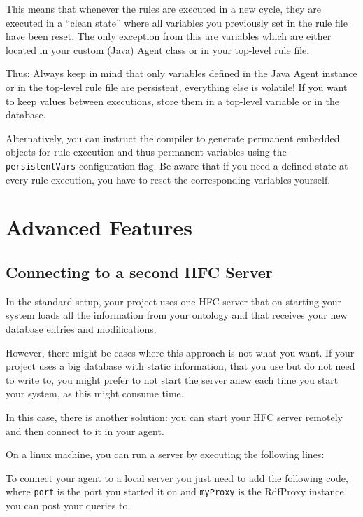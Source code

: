 This means that whenever the \vonda rules are executed in a new cycle,
they are executed in a ``clean state'' where all variables you
previously set in the rule file have been reset. The only exception
from this are variables which are either located in your custom (Java)
Agent class or in your top-level rule file.

Thus: Always keep in mind that only variables defined in the Java
Agent instance or in the top-level rule file are persistent,
everything else is volatile! If you want to keep values between
executions, store them in a top-level variable or in the database.

Alternatively, you can instruct the compiler to generate permanent embedded
objects for rule execution and thus permanent variables using the
\texttt{persistentVars} configuration flag. Be aware that if you need a defined
state at every rule execution, you have to reset the corresponding variables
yourself.

\section{Advanced Features}

\subsection{Connecting to a second HFC Server} \label{sec:2ndHfc}
In the standard setup, your \vonda project uses one HFC server that on starting your system loads all the information from your ontology and that receives your new database entries and modifications.

However, there might be cases where this approach is not what you want. If your project uses a big database with static information, that you use but do not need to write to, you might prefer to not start the server anew each time you start your system, as this might consume time.

In this case, there is another solution: you can start your HFC server remotely and then connect to it in your \vonda agent.

On a linux machine, you can run a server by executing the following lines:

To connect your \vonda agent to a local server you just need to add the following code, where \texttt{port} is the port you started it on and \texttt{myProxy} is the RdfProxy instance you can post your queries to.

